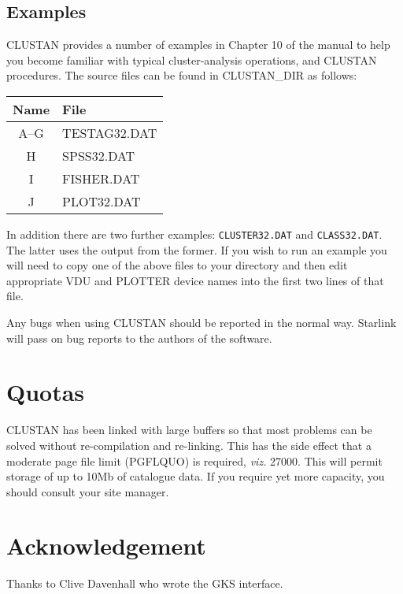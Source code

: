 \subsection{Examples}
{\small CLUSTAN} provides a number of examples in Chapter 10 of the manual to
help you become familiar with typical cluster-analysis operations,
and {\small CLUSTAN} procedures.
The source files can be found in CLUSTAN\_DIR as follows:
\begin{center}
\begin{tabular}{|c|l|}
\hline
Name & File \\ \hline
A--G & TESTAG32.DAT \\
H & SPSS32.DAT \\
I & FISHER.DAT \\
J & PLOT32.DAT \\ \hline
\end{tabular}
\end{center}
In addition there are two further examples: {\tt CLUSTER32.DAT} and
{\tt CLASS32.DAT}.  The latter uses the output from the former.
If you wish to run an example you will need to copy one of the above
files to your directory and then edit appropriate VDU and PLOTTER device
names into the first two lines of that file.

Any bugs when using {\small CLUSTAN} should be reported in the normal way.  
Starlink will pass on bug reports to the authors of the software.

\section{Quotas} {\small CLUSTAN} has been linked with large buffers so
that most problems can be solved without re-compilation and re-linking. 
This has the side effect that a moderate page file limit (PGFLQUO) is
required, {\it viz.} 27000.  This will permit storage of up to 10Mb of
catalogue data.  If you require yet more capacity, you should consult
your site manager. 

\section{Acknowledgement}
Thanks to Clive Davenhall who wrote the GKS interface.

